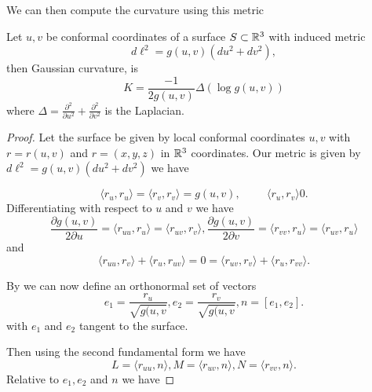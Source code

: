 We can then compute the curvature using this metric


\begin{theorem}\label{thm:log-curve}
	Let $u,v$ be conformal coordinates of a surface $S\subset \mathbb{R}^3$ with
	induced metric 
	$$d\ell^2=g(u,v)(du^2+dv^2),$$
	then Gaussian curvature,  is 
		\begin{equation}\label{eqn:log-curve}
			K=\frac{-1}{2g(u,v)}\Delta(\log g(u,v))
		\end{equation}
		where $\Delta=\frac{\partial^2}{\partial u^2}+\frac{\partial^2}{\partial v^2}$
		is the Laplacian.
\end{theorem}
\begin{proof}
	Let the surface be given by local conformal coordinates $u,v$
	with $r=r(u,v)$ and $r=(x,y,z)$ in $\mathbb{R}^3$ coordinates.
	Our metric is given by $d\ell^2=g(u,v)(du^2+dv^2)$
	we have 
	
	\begin{equation}\label{eqn:log-curve-proof-inners}
		\langle r_u,r_u\rangle = \langle r_v,r_v\rangle=g(u,v), \hspace{1cm} \langle r_u,r_v\rangle 0.
	\end{equation}
	Differentiating with respect to $u$ and $v$ we have
	\begin{equation}\label{eqn:log-curve-proof-firsts}
		\frac{ \partial g(u,v)}{2\partial u}=\langle r_{uu}, r_u\rangle =\langle r_{uv}, r_v\rangle,
		\frac{ \partial g(u,v)}{2\partial v}=\langle r_{vv}, r_u\rangle =\langle r_{uv}, r_u\rangle
		\end{equation}
		and
		\begin{equation}\label{eqn:log-curve-proof-firsts-1}
		\langle r_{uu},r_v\rangle + \langle r_u, r_{uv}\rangle=0=\langle r_{uv},r_v\rangle + \langle r_u, r_{vv}\rangle.
		\end{equation}
	
	
	By  we can now define an orthonormal set of vectors
	\begin{equation}\label{eqn:log-curve-proof-orthog}
		e_1=\frac{r_u}{\sqrt{g(u,v}}, e_2=\frac{r_v}{\sqrt{g(u,v}}, n=[e_1,e_2].
	\end{equation}
	with $e_1$ and $e_2$ tangent to the surface.
	
	Then using the second fundamental form we have
	$$L=\langle r_{uu},n\rangle , M=\langle r_{uv},n\rangle, N=\langle r_{vv},n\rangle.$$
	Relative to $e_1, e_2$ and $n$ we have
	

\end{proof}
